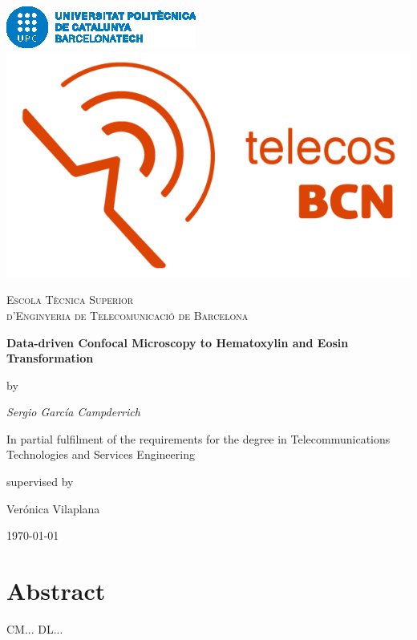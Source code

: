 \documentclass[a4paper,12pt,titlepage]{article}
\begin{document}
\begin{titlepage}
\centering

\includegraphics[height=0.07\textheight]{logo_barcelonatech}\hspace{0.5cm}
\includegraphics[height=0.07\textheight]{logo_telecos_2018}\par\vspace{1cm}

{\scshape\LARGE Escola Tècnica Superior \\ d'Enginyeria de Telecomunicació de Barcelona \par}\vspace{3mm}

{\huge\bfseries Data-driven Confocal Microscopy to Hematoxylin and Eosin Transformation\par}\vspace{2cm}

by\par
{\Large\itshape Sergio García Campderrich\par}
In partial fulfilment of the requirements for the degree in Telecommunications Technologies and Services Engineering\vfill

supervised by\par
Verónica Vilaplana

\vfill

{\large \today\par}
\end{titlepage}

\clearpage
\thispagestyle{empty}
\null\newpage

\section*{Abstract}
CM...
DL...
\thispagestyle{empty}
\end{document}
